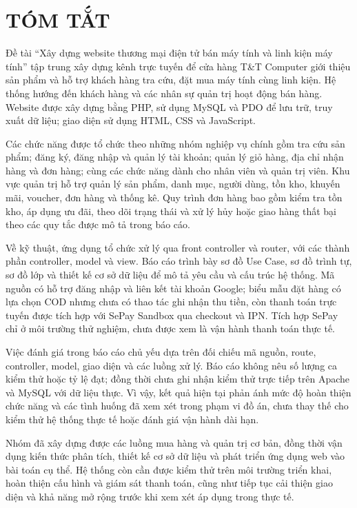 \chapter*{TÓM TẮT}
\vspace{-40pt}

Đề tài ``Xây dựng website thương mại điện tử bán máy tính và linh kiện máy tính'' tập trung xây dựng kênh trực tuyến để cửa hàng T\&T Computer giới thiệu sản phẩm và hỗ trợ khách hàng tra cứu, đặt mua máy tính cùng linh kiện. Hệ thống hướng đến khách hàng và các nhân sự quản trị hoạt động bán hàng. Website được xây dựng bằng PHP, sử dụng MySQL và PDO để lưu trữ, truy xuất dữ liệu; giao diện sử dụng HTML, CSS và JavaScript.

Các chức năng được tổ chức theo những nhóm nghiệp vụ chính gồm tra cứu sản phẩm; đăng ký, đăng nhập và quản lý tài khoản; quản lý giỏ hàng, địa chỉ nhận hàng và đơn hàng; cùng các chức năng dành cho nhân viên và quản trị viên. Khu vực quản trị hỗ trợ quản lý sản phẩm, danh mục, người dùng, tồn kho, khuyến mãi, voucher, đơn hàng và thống kê. Quy trình đơn hàng bao gồm kiểm tra tồn kho, áp dụng ưu đãi, theo dõi trạng thái và xử lý hủy hoặc giao hàng thất bại theo các quy tắc được mô tả trong báo cáo.

Về kỹ thuật, ứng dụng tổ chức xử lý qua front controller và router, với các thành phần controller, model và view. Báo cáo trình bày sơ đồ Use Case, sơ đồ trình tự, sơ đồ lớp và thiết kế cơ sở dữ liệu để mô tả yêu cầu và cấu trúc hệ thống. Mã nguồn có hỗ trợ đăng nhập và liên kết tài khoản Google; biểu mẫu đặt hàng có lựa chọn COD nhưng chưa có thao tác ghi nhận thu tiền, còn thanh toán trực tuyến được tích hợp với SePay Sandbox qua checkout và IPN. Tích hợp SePay chỉ ở môi trường thử nghiệm, chưa được xem là vận hành thanh toán thực tế.

Việc đánh giá trong báo cáo chủ yếu dựa trên đối chiếu mã nguồn, route, controller, model, giao diện và các luồng xử lý. Báo cáo không nêu số lượng ca kiểm thử hoặc tỷ lệ đạt; đồng thời chưa ghi nhận kiểm thử trực tiếp trên Apache và MySQL với dữ liệu thực. Vì vậy, kết quả hiện tại phản ánh mức độ hoàn thiện chức năng và các tình huống đã xem xét trong phạm vi đồ án, chưa thay thế cho kiểm thử hệ thống thực tế hoặc đánh giá vận hành dài hạn.

Nhóm đã xây dựng được các luồng mua hàng và quản trị cơ bản, đồng thời vận dụng kiến thức phân tích, thiết kế cơ sở dữ liệu và phát triển ứng dụng web vào bài toán cụ thể. Hệ thống còn cần được kiểm thử trên môi trường triển khai, hoàn thiện cấu hình và giám sát thanh toán, cũng như tiếp tục cải thiện giao diện và khả năng mở rộng trước khi xem xét áp dụng trong thực tế.

